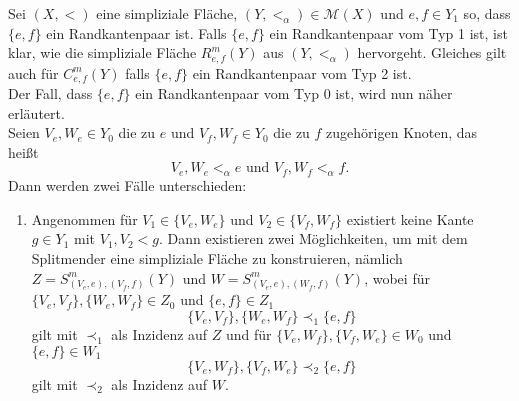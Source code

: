\documentclass[12pt,titlepage]{article}
\begin{document}
\begin{bemerkung}
Sei $(X,<)$ eine simpliziale Fläche, $(Y,<_{\alpha})\in \mathcal{M}(X)$ und $e,f \in Y_1$ so, dass $\{e,f\}$ ein Randkantenpaar ist.
 Falls $\{e,f\}$ ein Randkantenpaar vom Typ 1 ist, ist klar, wie die simpliziale Fläche $R^m_{e,f}(Y)$ aus $(Y,<_{\alpha})$ hervorgeht. Gleiches gilt auch für $C^m_{e,f}(Y)$ falls $\{e,f\}$ ein Randkantenpaar vom Typ 2 ist.\\
Der Fall, dass $\{e,f\}$ ein Randkantenpaar vom Typ 0 ist, wird nun näher erläutert.\\
Seien $V_e,W_e \in Y_0$ die zu $e$ und $V_f,W_f \in Y_0$ die zu $f$ zugehörigen Knoten, das heißt
\[
V_e,W_e <_{\alpha} e \text{ und } V_f,W_f<_{\alpha} f.
\]  
Dann werden zwei Fälle unterschieden:
\begin{enumerate}
\item Angenommen für $V_1\in \{V_e,W_e\}$ und $V_2 \in \{V_f,W_f\}$ existiert keine Kante $g \in Y_1$ mit $V_1,V_2 <g$. Dann existieren zwei Möglichkeiten, um mit dem Splitmender eine simpliziale Fläche zu konstruieren, nämlich $Z=S^m_{(V_e,e),(V_f,f)}(Y)$ und $W=S^m_{(V_e,e),(W_f,f)}(Y)$, 
wobei für $\{V_e,V_f\},\{W_e,W_f\} \in Z_0$ und $\{e,f\} \in Z_1$
\[
\{V_e,V_f\},\{W_e,W_f\}\prec_1 \{e,f\}
\] gilt mit $\prec_1$ als Inzidenz auf $Z$ und für $\{V_e, W_f\},\{V_f,W_e\}\in W_0$ und $\{e,f\}\in W_1$
\[
\{V_e,W_f\},\{V_f,W_e\}\prec_2 \{e,f\} 
\] gilt mit $\prec_2$ als Inzidenz auf $W$.
 \\
\end{enumerate}
\end{bemerkung}
\end{document}
